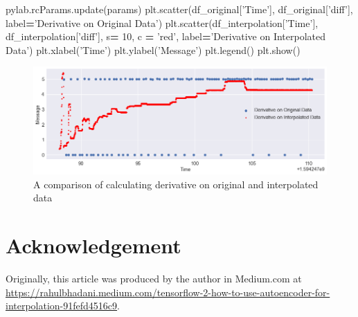 \documentclass[onecolumn]{article}
\newenvironment{Shaded}{\begin{snugshade}}{\end{snugshade}}
\newcommand{\DecValTok}[1]{\textcolor[rgb]{0.00,0.00,0.81}{#1}}
\newcommand{\StringTok}[1]{\textcolor[rgb]{0.31,0.60,0.02}{#1}}
\newcommand{\OperatorTok}[1]{\textcolor[rgb]{0.81,0.36,0.00}{\textbf{#1}}}
\newcommand{\NormalTok}[1]{#1}
\begin{document}
\begin{Shaded}
\begin{Highlighting}[]
\NormalTok{pylab.rcParams.update(params)}
\NormalTok{plt.scatter(df_original[}\StringTok{'Time'}\NormalTok{], df_original[}\StringTok{'diff'}\NormalTok{], label}\OperatorTok{=}\StringTok{'Derivative on Original Data'}\NormalTok{)}
\NormalTok{plt.scatter(df_interpolation[}\StringTok{'Time'}\NormalTok{], df_interpolation[}\StringTok{'diff'}\NormalTok{], }
\NormalTok{    s}\OperatorTok{=} \DecValTok{10}\NormalTok{, c }\OperatorTok{=} \StringTok{'red'}\NormalTok{, label}\OperatorTok{=}\StringTok{'Derivative on Interpolated Data'}\NormalTok{)}
\NormalTok{plt.xlabel(}\StringTok{'Time'}\NormalTok{)}
\NormalTok{plt.ylabel(}\StringTok{'Message'}\NormalTok{)}
\NormalTok{plt.legend()}
\NormalTok{plt.show()}
\end{Highlighting}
\end{Shaded}

\begin{figure}
\centering
\includegraphics[width=1.00000\textwidth]{derivative_TF2.png}
\caption{A comparison of calculating derivative on original and
interpolated data\label{derivatives}}
\end{figure}

\section{Acknowledgement}\label{acknowledgement}

Originally, this article was produced by the author in Medium.com at
\url{https://rahulbhadani.medium.com/tensorflow-2-how-to-use-autoencoder-for-interpolation-91fefd4516c9}.

\renewcommand\refname{References}

\end{document}
